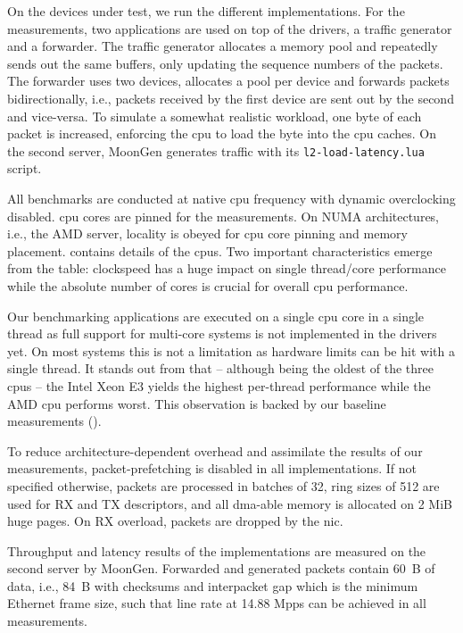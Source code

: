 On the devices under test, we run the different implementations. For the
measurements, two applications are used on top of the drivers, a traffic
generator and a forwarder. The traffic generator allocates a memory pool and
repeatedly sends out the same buffers, only updating the sequence numbers of the
packets. The forwarder uses two devices, allocates a pool per device and
forwards packets bidirectionally, i.e., packets received by the first device are
sent out by the second and vice-versa. To simulate a somewhat realistic
workload, one byte of each packet is increased, enforcing the \ac{cpu} to load
the byte into the \ac{cpu} caches. On the second server, MoonGen
\cite{emmerich2015moongen} generates traffic with its
\texttt{l2-load-latency.lua} script.

All benchmarks are conducted at native \ac{cpu} frequency with dynamic
overclocking disabled. \ac{cpu} cores are pinned for the measurements. On NUMA
architectures, i.e., the AMD server, locality is obeyed for \ac{cpu} core
pinning and memory placement.  contains details of the \acp{cpu}.
Two important characteristics emerge from the table: clockspeed has a huge
impact on single thread/core performance while the absolute number of cores is
crucial for overall \ac{cpu} performance.

Our benchmarking applications are executed on a single \ac{cpu} core in a single
thread as full support for multi-core systems is not implemented in the drivers
yet. On most systems this is not a limitation as hardware limits can be hit with
a single thread. It stands out from  that -- although being the
oldest of the three \acp{cpu} -- the Intel Xeon E3 yields the highest per-thread
performance while the AMD \ac{cpu} performs worst. This observation is backed by
our baseline measurements ().

To reduce architecture-dependent overhead and assimilate the results of our
measurements, packet-prefetching is disabled in all implementations. If not
specified otherwise, packets are processed in batches of 32, ring sizes of 512
are used for RX and TX descriptors, and all \ac{dma}-able memory is allocated on
2 MiB huge pages. On RX overload, packets are dropped by the \ac{nic}.

Throughput and latency results of the implementations are measured on the second
server by MoonGen. Forwarded and generated packets contain 60~B of data, i.e.,
84~B with checksums and interpacket gap which is the minimum Ethernet frame
size, such that line rate at 14.88 Mpps can be achieved in all measurements.

